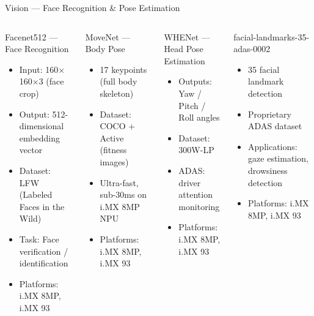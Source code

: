 \documentclass[aspectratio=169]{beamer}
\begin{document}
\begin{frame}{Vision — Face Recognition \& Pose Estimation}
  \begin{columns}[T]
      \begin{block}{Facenet512 — Face Recognition}
        \begin{itemize}\scriptsize
          \item Input: 160$\times$160$\times$3 (face crop)
          \item Output: 512-dimensional embedding vector
          \item Dataset: LFW (Labeled Faces in the Wild)
          \item Task: Face verification / identification
          \item Platforms: i.MX 8MP, i.MX 93
        \end{itemize}
      \end{block}
      \vspace{4pt}
      \begin{block}{MoveNet — Body Pose}
        \begin{itemize}\scriptsize
          \item 17 keypoints (full body skeleton)
          \item Dataset: COCO + Active (fitness images)
          \item Ultra-fast, sub-30ms on i.MX 8MP NPU
          \item Platforms: i.MX 8MP, i.MX 93
        \end{itemize}
      \end{block}
      \begin{block}{WHENet — Head Pose Estimation}
        \begin{itemize}\scriptsize
          \item Outputs: Yaw / Pitch / Roll angles
          \item Dataset: 300W-LP
          \item ADAS: driver attention monitoring
          \item Platforms: i.MX 8MP, i.MX 93
        \end{itemize}
      \end{block}
      \vspace{4pt}
      \begin{block}{facial-landmarks-35-adas-0002}
        \begin{itemize}\scriptsize
          \item \alert{35 facial landmark} detection
          \item Proprietary ADAS dataset
          \item Applications: gaze estimation, drowsiness detection
          \item Platforms: i.MX 8MP, i.MX 93
        \end{itemize}
      \end{block}
  \end{columns}
\end{frame}
\end{document}
